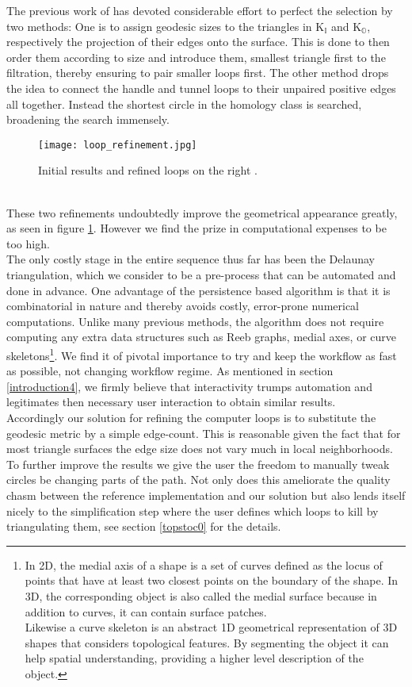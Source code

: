 The previous work of \citep[][]{Dey2007, Dey2008, Dey2009} has devoted considerable effort to perfect the selection by two methods: 
One is to assign geodesic sizes to the triangles in $\mathrm{K}_{\mathbb{I}}$ and $\mathrm{K}_{\mathbb{O}}$, respectively the projection of their edges onto the surface.
This is done to then order them according to size and introduce them, smallest triangle first to the filtration, thereby ensuring to pair smaller loops first.
The other method drops the idea to connect the handle and tunnel loops to their unpaired positive edges all together.
Instead the shortest circle in the homology class is searched, broadening the search immensely.
\begin{figure}[htb]
\centering
\texttt{[image: loop\_refinement.jpg]}
\caption{Initial results and refined loops on the right \citep[][]{Dey2009}.}
\label{fig:loop_refinement}
\end{figure}\\
These two refinements undoubtedly improve the geometrical appearance greatly, as seen in figure \ref{fig:loop_refinement}.
However we find the prize in computational expenses to be too high.\\
The only costly stage in the entire sequence thus far has been the Delaunay triangulation, which we consider to be a pre-process that can be automated and done in advance.
One advantage of the persistence based algorithm is that it is combinatorial in nature and thereby avoids costly, error-prone numerical computations.
Unlike many previous methods, the algorithm does not require computing any extra data structures such as Reeb graphs, medial axes, or curve skeletons\footnote{ In 2D, the medial axis of a shape is a set of curves defined as the locus of points that have at least two closest points on the boundary of the shape. In 3D, the corresponding object is also called the medial surface because in addition to curves, it can contain surface patches.\\
Likewise a curve skeleton is an abstract 1D geometrical representation of 3D shapes that considers topological features. By segmenting the object it can help spatial understanding, providing a higher level description of the object.}.
We find it of pivotal importance to try and keep the workflow as fast as possible, not changing workflow regime.
As mentioned in section \ref{introduction4}, we firmly believe that interactivity trumps automation and legitimates then necessary user interaction to obtain similar results.\\
Accordingly our solution for refining the computer loops is to substitute the geodesic metric by a simple edge-count.
This is reasonable given the fact that for most triangle surfaces the edge size does not vary much in local neighborhoods.
To further improve the results we give the user the freedom to manually tweak circles be changing parts of the path.
Not only does this ameliorate the quality chasm between the reference implementation and our solution but also lends itself nicely to the simplification step where the user defines which loops to kill by triangulating them, see section \ref{topstoc0} for the details.

